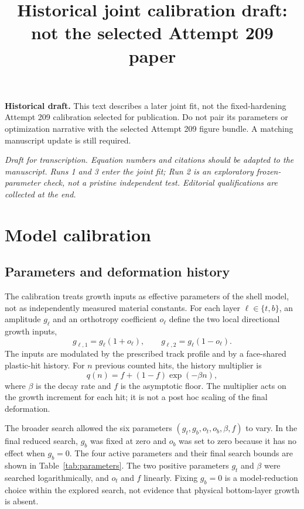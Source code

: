 \documentclass[11pt]{article}
\begin{document}
\title{Historical joint calibration draft: not the selected Attempt 209 paper}
\author{}\date{}\maketitle
\noindent\textbf{Historical draft.} This text describes a later joint fit, not the fixed-hardening Attempt 209 calibration selected for publication. Do not pair its parameters or optimization narrative with the selected Attempt 209 figure bundle. A matching manuscript update is still required.\par
\noindent\textit{Draft for transcription. Equation numbers and citations should be adapted to the manuscript. Runs 1 and 3 enter the joint fit; Run 2 is an exploratory frozen-parameter check, not a pristine independent test. Editorial qualifications are collected at the end.}

\section{Model calibration}
\subsection{Parameters and deformation history}
The calibration treats growth inputs as effective parameters of the shell model, not as independently measured material constants. For each layer $\ell\in\{t,b\}$, an amplitude $g_\ell$ and an orthotropy coefficient $o_\ell$ define the two local directional growth inputs,
\begin{equation}
 g_{\ell,1}=g_\ell(1+o_\ell),\qquad
 g_{\ell,2}=g_\ell(1-o_\ell).
 \label{eq:directional}
\end{equation}
The inputs are modulated by the prescribed track profile and by a face-shared plastic-hit history. For $n$ previous counted hits, the history multiplier is
\begin{equation}
 q(n)=f+(1-f)\exp(-\beta n),
 \label{eq:hardening}
\end{equation}
where $\beta$ is the decay rate and $f$ is the asymptotic floor. The multiplier acts on the growth increment for each hit; it is not a post hoc scaling of the final deformation.

The broader search allowed the six parameters $(g_t,g_b,o_t,o_b,\beta,f)$ to vary. In the final reduced search, $g_b$ was fixed at zero and $o_b$ was set to zero because it has no effect when $g_b=0$. The four active parameters and their final search bounds are shown in Table~\ref{tab:parameters}. The two positive parameters $g_t$ and $\beta$ were searched logarithmically, and $o_t$ and $f$ linearly. Fixing $g_b=0$ is a model-reduction choice within the explored search, not evidence that physical bottom-layer growth is absent.
\end{document}
